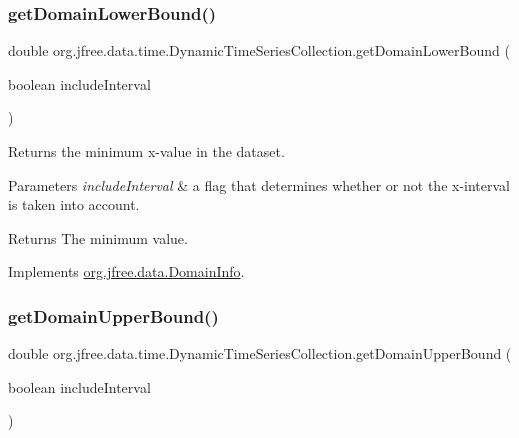 \subsubsection{\texorpdfstring{get\+Domain\+Lower\+Bound()}{getDomainLowerBound()}}
{\footnotesize\ttfamily double org.\+jfree.\+data.\+time.\+Dynamic\+Time\+Series\+Collection.\+get\+Domain\+Lower\+Bound (\begin{DoxyParamCaption}\item[{boolean}]{include\+Interval }\end{DoxyParamCaption})}

Returns the minimum x-\/value in the dataset.


\begin{DoxyParams}{Parameters}
{\em include\+Interval} & a flag that determines whether or not the x-\/interval is taken into account.\\
\hline
\end{DoxyParams}
\begin{DoxyReturn}{Returns}
The minimum value. 
\end{DoxyReturn}


Implements \mbox{\hyperlink{interfaceorg_1_1jfree_1_1data_1_1_domain_info_ae1b4d9d415fe0a79bd2ce0f6e0a3f489}{org.\+jfree.\+data.\+Domain\+Info}}.

\mbox{\label{classorg_1_1jfree_1_1data_1_1time_1_1_dynamic_time_series_collection_a471679946440bd1e4a7b9fd2f8c7b21a}} 
\subsubsection{\texorpdfstring{get\+Domain\+Upper\+Bound()}{getDomainUpperBound()}}
{\footnotesize\ttfamily double org.\+jfree.\+data.\+time.\+Dynamic\+Time\+Series\+Collection.\+get\+Domain\+Upper\+Bound (\begin{DoxyParamCaption}\item[{boolean}]{include\+Interval }\end{DoxyParamCaption})}

